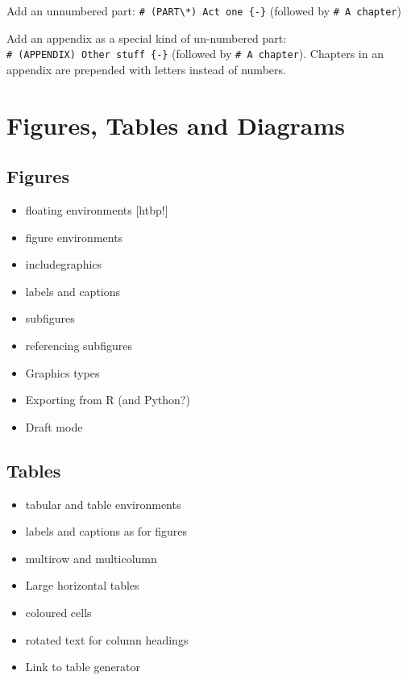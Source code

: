 \documentclass[
]{book}
\begin{document}
Add an unnumbered part: \texttt{\#\ (PART\textbackslash{}*)\ Act\ one\ \{-\}} (followed by \texttt{\#\ A\ chapter})

Add an appendix as a special kind of un-numbered part: \texttt{\#\ (APPENDIX)\ Other\ stuff\ \{-\}} (followed by \texttt{\#\ A\ chapter}). Chapters in an appendix are prepended with letters instead of numbers.

\hypertarget{figures-tables-and-diagrams}{%
\chapter{Figures, Tables and Diagrams}\label{figures-tables-and-diagrams}}

\hypertarget{figures}{%
\section{Figures}\label{figures}}

\begin{itemize}
\item
  floating environments {[}htbp!{]}
\item
  figure environments
\item
  includegraphics
\item
  labels and captions
\item
  subfigures
\item
  referencing subfigures
\item
  Graphics types
\item
  Exporting from R (and Python?)
\item
  Draft mode
\end{itemize}

\hypertarget{tables}{%
\section{Tables}\label{tables}}

\begin{itemize}
\item
  tabular and table environments
\item
  labels and captions as for figures
\item
  multirow and multicolumn
\item
  Large horizontal tables
\item
  coloured cells
\item
  rotated text for column headings
\item
  Link to table generator
\end{itemize}
\end{document}
